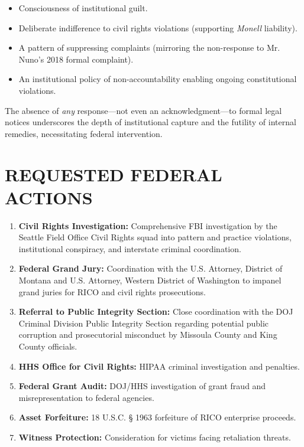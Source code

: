 \documentclass[12pt,oneside]{article}
\begin{document}
\begin{flushleft}
\begin{itemize}
\item Consciousness of institutional guilt.
\item Deliberate indifference to civil rights violations (supporting \textit{Monell} liability).
\item A pattern of suppressing complaints (mirroring the non-response to Mr. Nuno’s 2018 formal complaint).
\item An institutional policy of non-accountability enabling ongoing constitutional violations.
\end{itemize}

The absence of \textit{any} response---not even an acknowledgment---to formal legal notices underscores the depth of institutional capture and the futility of internal remedies, necessitating federal intervention.

\section*{REQUESTED FEDERAL ACTIONS}

\begin{enumerate}
\item \textbf{Civil Rights Investigation:} Comprehensive FBI investigation by the Seattle Field Office Civil Rights squad into pattern and practice violations, institutional conspiracy, and interstate criminal coordination.
\item \textbf{Federal Grand Jury:} Coordination with the U.S. Attorney, District of Montana and U.S. Attorney, Western District of Washington to impanel grand juries for RICO and civil rights prosecutions.
\item \textbf{Referral to Public Integrity Section:} Close coordination with the DOJ Criminal Division Public Integrity Section regarding potential public corruption and prosecutorial misconduct by Missoula County and King County officials.
\item \textbf{HHS Office for Civil Rights:} HIPAA criminal investigation and penalties.
\item \textbf{Federal Grant Audit:} DOJ/HHS investigation of grant fraud and misrepresentation to federal agencies.
\item \textbf{Asset Forfeiture:} 18 U.S.C. § 1963 forfeiture of RICO enterprise proceeds.
\item \textbf{Witness Protection:} Consideration for victims facing retaliation threats.
\end{enumerate}


\end{flushleft}
\end{document}

